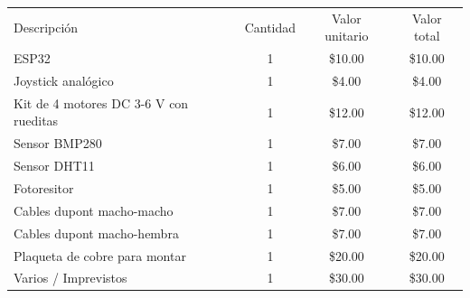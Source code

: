 \documentclass[
11pt, %
]{charter}
\begin{document}
\begin{table}[htpb]
\centering
\begin{tabularx}{\linewidth}{@{}|X|c|r|r|@{}}
\hline
\rowcolor[HTML]{C0C0C0} 
\multicolumn{4}{|c|}{\cellcolor[HTML]{C0C0C0}COSTOS DIRECTOS} \\ \hline
\rowcolor[HTML]{C0C0C0} 
Descripción &
  \multicolumn{1}{c|}{\cellcolor[HTML]{C0C0C0}Cantidad} &
  \multicolumn{1}{c|}{\cellcolor[HTML]{C0C0C0}Valor unitario} &
  \multicolumn{1}{c|}{\cellcolor[HTML]{C0C0C0}Valor total} \\ \hline
 ESP32 & 
  \multicolumn{1}{c|}{1} &
  \multicolumn{1}{c|}{\$10.00} &
  \multicolumn{1}{c|}{\$10.00} \\ \hline
 Joystick analógico &
  \multicolumn{1}{c|}{1} &
  \multicolumn{1}{c|}{\$4.00} &
  \multicolumn{1}{c|}{\$4.00} \\ \hline
 Kit de 4 motores DC 3-6 V con rueditas &
  \multicolumn{1}{c|}{1} &
  \multicolumn{1}{c|}{\$12.00} &
  \multicolumn{1}{c|}{\$12.00} \\ \hline
 Sensor BMP280 &
  \multicolumn{1}{c|}{1} &
  \multicolumn{1}{c|}{\$7.00} &
  \multicolumn{1}{c|}{\$7.00} \\ \hline
 Sensor DHT11 &
  \multicolumn{1}{c|}{1} &
  \multicolumn{1}{c|}{\$6.00} &
  \multicolumn{1}{c|}{\$6.00} \\ \hline
 Fotoresitor &
  \multicolumn{1}{c|}{1} &
  \multicolumn{1}{c|}{\$5.00} &
  \multicolumn{1}{c|}{\$5.00} \\ \hline
 Cables dupont macho-macho &
  \multicolumn{1}{c|}{1} &
  \multicolumn{1}{c|}{\$7.00} &
  \multicolumn{1}{c|}{\$7.00} \\ \hline
 Cables dupont macho-hembra &
  \multicolumn{1}{c|}{1} &
  \multicolumn{1}{c|}{\$7.00} &
  \multicolumn{1}{c|}{\$7.00} \\ \hline
 Plaqueta de cobre para montar &
  \multicolumn{1}{c|}{1} &
  \multicolumn{1}{c|}{\$20.00} &
  \multicolumn{1}{c|}{\$20.00} \\ \hline
 Varios / Imprevistos &
  \multicolumn{1}{c|}{1} &
  \multicolumn{1}{c|}{\$30.00} &
  \multicolumn{1}{c|}{\$30.00} \\ \hline


\end{tabularx}
\end{table}
\end{document}
